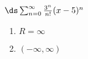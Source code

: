 {$\ds\sum_{n=0}^\infty \frac{3^n}{n!}(x-5)^{n}$
}
{\begin{enumerate}
	\item $R=\infty$
	\item	$(-\infty,\infty)$
\end{enumerate}
}